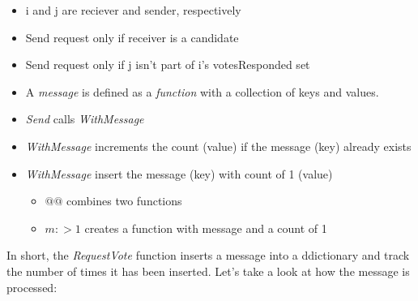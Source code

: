 \documentclass{report}
\begin{document}
\begin{itemize}
    \item i and j are reciever and sender, respectively
    \item Send request only if receiver is a candidate
    \item Send request only if j isn't part of i's votesResponded set
    \item A \textit{message} is defined as a \textit{function} with a collection
    of keys and values. 
    \item \textit{Send} calls \textit{WithMessage}
    \item \textit{WithMessage} increments the count (value) if the message (key) already exists
    \item \textit{WithMessage} insert the message (key) with count of 1 (value) 
    \begin{itemize}
        \item $@@$ combines two functions
        \item $m :> 1$ creates a function with message and a count of 1
    \end{itemize}
\end{itemize}

In short, the \textit{RequestVote} function inserts a message into a ddictionary
and track the number of times it has been inserted. Let's take a look at how the
message is processed:
\end{document}
